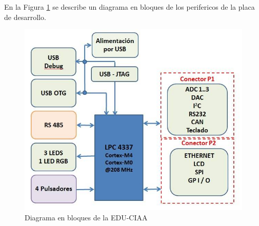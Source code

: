   
  
  
    
En la Figura \ref{fig:EDU_CIAA_esquema} se describe un diagrama en bloques de los perifericos de la placa de desarrollo.
\begin{figure}[H]
    \centering
    \includegraphics[width=0.6\linewidth]{Figuras/datalogger/Hardware/EDUCIAAesquema.png}
    \caption{Diagrama en bloques de la EDU-CIAA}
    \label{fig:EDU_CIAA_esquema}
\end{figure}


